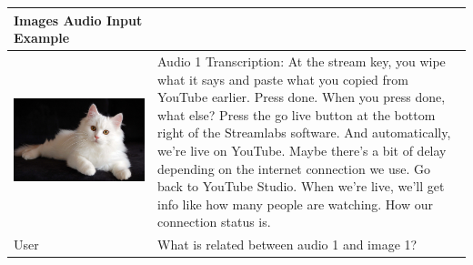 \documentclass[preprint]{article}
\begin{document}
\begin{table}[hbt]
  \centering
  \setlength{\extrarowheight}{3pt}
  \renewcommand{\arraystretch}{1.5}
  \begin{tabular}{>{\arraybackslash}m{6.5cm}>{\arraybackslash}m{6.5cm}}
    \hline
    \textbf{Images Audio Input Example}                                                                                                                                                                                                                                                                                                                                                                                                                                                                                                       \\[6pt]
    \hline
    \hline
    \includegraphics[width=0.9\linewidth]{pic/cat.jpg} & Audio 1 Transcription: At the stream key, you wipe what it says and paste what you copied from YouTube earlier. Press done. When you press done, what else? Press the go live button at the bottom right of the Streamlabs software. And automatically, we're live on YouTube. Maybe there's a bit of delay depending on the internet connection we use. Go back to YouTube Studio. When we're live, we'll get info like how many people are watching. How our connection status is. \\
    \hline
    User                                               & What is related between audio 1 and image 1?                                                                                                                                                                                                                                                                                                                                                                                                                                         \\

\end{tabular}
\end{table}
\end{document}
